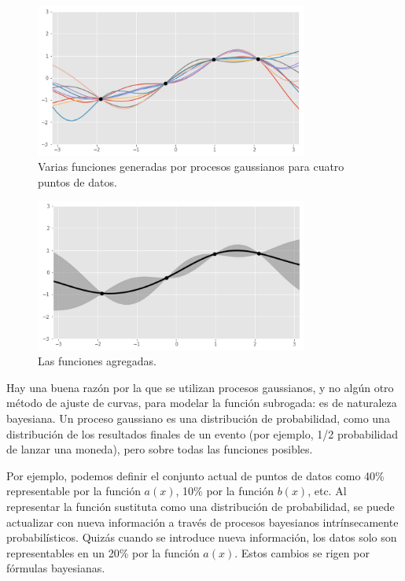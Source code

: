 \documentclass[a4paper,12pt]{article}
\begin{document}
\begin{figure}[H]
	\begin{center}
		\includegraphics[width=0.8\textwidth]{bayes_opt_4.png}
		\caption{Varias funciones generadas por procesos gaussianos para cuatro puntos de datos. \citep{Ye2020Oct}}
		\label{fig:bayes4}
	\end{center}
\end{figure}

\begin{figure}[H]
	\begin{center}
		\includegraphics[width=0.8\textwidth]{bayes_opt_5.png}
		\caption{Las funciones agregadas. \citep{Ye2020Oct}}
		\label{fig:bayes5}
	\end{center}
\end{figure}

Hay una buena razón por la que se utilizan procesos gaussianos, y no algún otro método de ajuste de curvas, para modelar la función subrogada: es de naturaleza bayesiana. Un proceso gaussiano es una distribución de probabilidad, como una distribución de los resultados finales de un evento (por ejemplo, 1/2 probabilidad de lanzar una moneda), pero sobre todas las funciones posibles.

Por ejemplo, podemos definir el conjunto actual de puntos de datos como 40\% representable por la función $a(x)$, 10\% por la función $b(x)$, etc. Al representar la función sustituta como una distribución de probabilidad, se puede actualizar con nueva información a través de procesos bayesianos intrínsecamente probabilísticos. Quizás cuando se introduce nueva información, los datos solo son representables en un 20\% por la función $a(x)$. Estos cambios se rigen por fórmulas bayesianas.
\end{document}
